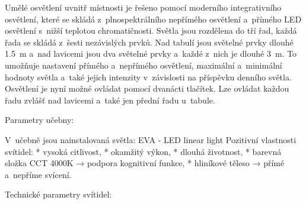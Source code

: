 Umělé osvětlení uvnitř místnosti je řešeno pomocí moderního integrativního osvětlení, které se skládá
z~plnospektrálního  nepřímého osvětlení a~přímého LED osvětlení s~nižší teplotou chromatičnosti.
Světla jsou rozdělena do tří řad, každá řada se skládá z~šesti nezávislých prvků.
Nad tabulí jsou světelné prvky dlouhé 1.5~m a~nad lavicemi jsou dva světelné prvky a~každé z~nich je dlouhé 3~m.
To umožňuje nastavení přímého a~nepřímého osvětlení, maximální a~minimální hodnoty světla
a~také jejich intenzity v~závislosti na příspěvku denního světla.
Osvětlení je nyní možné ovládat pomocí dvanácti tlačítek. Lze ovládat každou řadu zvlášť nad lavicemi
a~také jen přední řadu u~tabule.


\medskip
{\sbf Parametry učebny:}
\medskip


\medskip
\medskip
\medskip
V~učebně jsou nainstalovaná světla: EVA - LED linear light
\medskip
{\sbf Pozitivní vlastnosti svítidel}:
\begitems
    * vysoká citlivost,
    * okamžitý výkon,
    * dlouhá životnost,
    * barevná složka CCT 4000K → podpora kognitivní funkce,
    * hliníkové těleso → přímé a~nepříme svícení.
\enditems
\medskip

{\sbf Technické parametry svítidel:}
\medskip
{}

